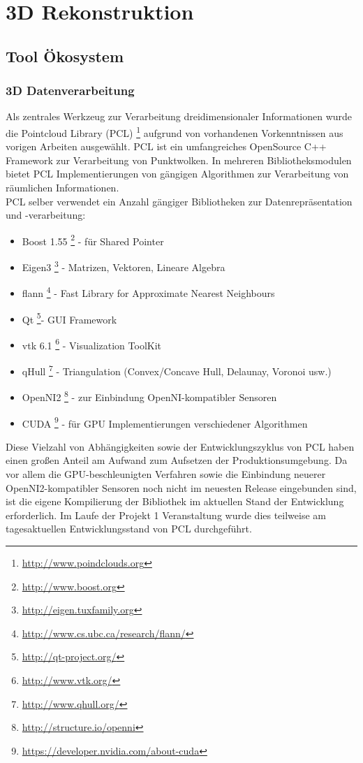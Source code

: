 \section{3D Rekonstruktion}
\subsection{Tool Ökosystem}
\subsubsection{3D Datenverarbeitung}
Als zentrales Werkzeug zur Verarbeitung dreidimensionaler Informationen wurde die Pointcloud Library (PCL) \footnote{\url{http://www.poindclouds.org}} aufgrund von vorhandenen Vorkenntnissen aus vorigen Arbeiten ausgewählt. PCL ist ein umfangreiches OpenSource C++ Framework zur Verarbeitung von Punktwolken. In mehreren Bibliotheksmodulen bietet PCL Implementierungen von gängigen Algorithmen zur Verarbeitung von räumlichen Informationen.\\
PCL selber verwendet ein Anzahl gängiger Bibliotheken zur Datenrepräsentation und -verarbeitung:

\begin{itemize}
		\item Boost 1.55 \footnote{\url{http://www.boost.org}} - für Shared Pointer
		\item Eigen3 \footnote{\url{http://eigen.tuxfamily.org}} - Matrizen, Vektoren, Lineare Algebra
		\item flann \footnote{\url{http://www.cs.ubc.ca/research/flann/}} - Fast Library for Approximate Nearest Neighbours
		\item Qt \footnote{\url{http://qt-project.org/}}- GUI Framework
		\item vtk 6.1 \footnote{\url{http://www.vtk.org/}} - Visualization ToolKit
		\item qHull \footnote{\url{http://www.qhull.org/}} - Triangulation (Convex/Concave Hull, Delaunay, Voronoi usw.)
		\item OpenNI2 \footnote{\url{http://structure.io/openni}} - zur Einbindung OpenNI-kompatibler Sensoren
		\item CUDA \footnote{\url{https://developer.nvidia.com/about-cuda}} - für GPU Implementierungen verschiedener Algorithmen
\end{itemize}

Diese Vielzahl von Abhängigkeiten sowie der Entwicklungszyklus von PCL haben einen großen Anteil am Aufwand zum Aufsetzen der Produktionsumgebung. Da vor allem die GPU-beschleunigten Verfahren sowie die Einbindung neuerer OpenNI2-kompatibler Sensoren noch nicht im neuesten Release eingebunden sind, ist die eigene Kompilierung der Bibliothek im aktuellen Stand der Entwicklung erforderlich. Im Laufe der Projekt 1 Veranstaltung wurde dies teilweise am tagesaktuellen Entwicklungsstand von PCL durchgeführt.

